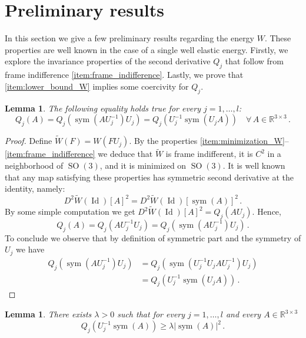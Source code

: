 \documentclass{article}
\theoremstyle{plain}
\theoremstyle{plain}
\theoremstyle{plain}
\newtheorem{lemma}[teo]{Lemma}
\theoremstyle{plain}
\theoremstyle{plain}
\theoremstyle{definition}
\theoremstyle{definition}
\renewcommand{\r}{\mathbb{R}}
\DeclareMathOperator{\Id}{Id}
\DeclareMathOperator{\SO}{SO}
\DeclareMathOperator{\sym}{sym}
\begin{document}
\section{Preliminary results}

In this section we give a few preliminary results regarding the energy $W$. These properties are well known in the case of a single well elastic energy. Firstly, we explore the invariance properties of the second derivative $Q_j$ that follow from frame indifference \ref{item:frame_indifference}. Lastly, we prove that \ref{item:lower_bound_W} implies some coercivity for $Q_j$. 

\begin{lemma}\label{lemma:simmetry_second_derivative}
    The following equality holds true for every $j = 1, \dots, l$:
    \[
        Q_j(A) = Q_j(\sym(AU_j^{-1})U_j) = Q_j(U_j^{-1}\sym(U_jA)) \quad \forall \, A \in \r^{3 \times 3}\,.
    \]
\end{lemma}

\begin{proof}
    Define $\tilde W(F) = W(FU_j)$. By the properties \ref{item:minimization_W}--\ref{item:frame_indifference} we deduce that $\tilde W$ is frame indifferent, it is $C^2$ in a neighborhood of $\SO(3)$, and it is minimized on $\SO(3)$. It is well known that any map satisfying these properties has symmetric second derivative at the identity, namely:
    \[
        D^2\tilde W(\Id)[A]^2 = D^2\tilde W(\Id)[\sym(A)]^2 \,.
    \]
    By some simple computation we get $D^2 \tilde W(\Id)[A]^2 = Q_j(AU_j)$. Hence,
    \[
        Q_j(A) = Q_j(AU_j^{-1}U_j) = Q_j(\sym(AU_j^{-1})U_j)\,.
    \]
    To conclude we observe that by definition of symmetric part and the symmetry of $U_j$ we have 
    \begin{align}
        Q_j(\sym(AU_j^{-1})U_j) & = Q_j(\sym(U_j^{-1}U_jAU_j^{-1})U_j)  \\
        & = Q_j(U_j^{-1}\sym(U_jA)) \,.
    \end{align}
\end{proof}

\begin{lemma}\label{lemma:coercivity_second_derivative}
    There exists $\lambda > 0$ such that for every $j = 1, \dots, l$ and every $A \in \r^{3 \times 3}$
    \[
        Q_j(U_j^{-1}\sym(A)) \geq \lambda |\sym(A)|^2 \,.
    \]
\end{lemma}
\end{document}
